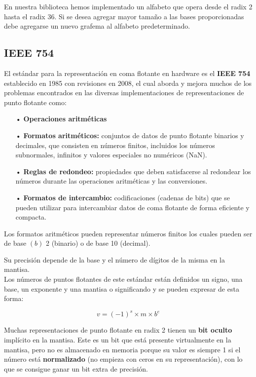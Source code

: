 \documentclass[a4paper,10pt,twocolumn]{article}
\begin{document}
	En nuestra biblioteca hemos implementado un alfabeto que opera desde el radix 2 hasta el radix 36. Si se desea agregar mayor tamaño a las bases proporcionadas debe agregarse un nuevo grafema al alfabeto predeterminado. \\       
	
	\subsection{IEEE 754}
	
	El estándar para la representación en coma flotante en hardware es el \textbf{IEEE 754} establecido en 1985 con revisiones en 2008, el cual aborda y mejora muchos de los problemas encontrados en las diversas implementaciones de representaciones de punto flotante como: \\
	\begin{itemize}
		\item[•] \textbf{Operaciones aritméticas}\\
		\item[•] \textbf{Formatos aritméticos:}
		conjuntos de datos de punto flotante binarios y decimales, que consisten en números finitos, incluidos los números subnormales, infinitos y valores especiales no numéricos (NaN). \\
		\item[•] \textbf{Reglas de redondeo:}  propiedades que deben satisfacerse al redondear los números durante las operaciones aritméticas y las conversiones.
		\item[•] \textbf{Formatos de intercambio:}  codificaciones (cadenas de bits) que se pueden utilizar para intercambiar datos de coma flotante de forma eficiente y compacta.
	\end{itemize}      
	
	Los formatos aritméticos pueden representar números finitos los cuales pueden ser de base $(b)$ 2 (binario) o de base 10 (decimal).
	
	Su precisión depende de la base y el número de dígitos de la misma en la mantisa.\\
	
	Los números de puntos flotantes de este estándar están definidos un signo, una base, un exponente y una mantisa o significando y se pueden expresar de esta forma:
	
	\begin{equation}
		v = (-1)^{s} \times m \times b^{e}
	\end{equation}
	
	Muchas representaciones de punto flotante en radix 2 tienen un \textbf{bit oculto} implícito en la mantisa. Este es un bit que está presente virtualmente en la mantisa, pero no es almacenado en memoria porque su valor es siempre 1 si el número está \textbf{normalizado} (no empieza con ceros en su representación), con lo que se consigue ganar un bit extra de precisión.\\
	
\end{document}
